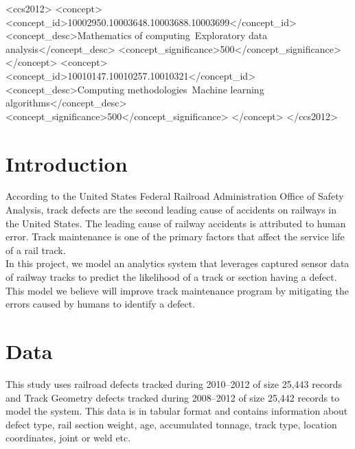 \documentclass{sig-alternate-05-2015}
\begin{document}
\maketitle
\begin{abstract}

\end{abstract}


%
%

\begin{CCSXML}
<ccs2012>
<concept>
    <concept_id>10002950.10003648.10003688.10003699</concept_id>
    <concept_desc>Mathematics of computing~Exploratory data analysis</concept_desc>
    <concept_significance>500</concept_significance>
</concept>
<concept>
    <concept_id>10010147.10010257.10010321</concept_id>
    <concept_desc>Computing methodologies~Machine learning algorithms</concept_desc>
    <concept_significance>500</concept_significance>
</concept>
</ccs2012> 
\end{CCSXML}


\printccsdesc


\section{Introduction}
According to the United States Federal Railroad Administration Office of Safety Analysis, track defects are the second leading cause of accidents on railways in the United States. The leading cause of railway accidents is attributed to human error. Track maintenance is one of the primary factors that affect the service life of a rail track.\\

In this project, we model an analytics system that leverages captured sensor data of railway tracks to predict the likelihood of a track or section having a defect. This model we believe will improve track maintenance program by mitigating the errors caused by humans to identify a defect.

\section {Data}
This study uses railroad defects tracked during 2010--2012 of size 25,443 records and Track Geometry defects tracked during 2008--2012 of size 25,442 records to model the system. This data is in tabular format and contains information about defect type, rail section weight, age, accumulated tonnage, track type, location coordinates, joint or weld etc.
\end{document}
